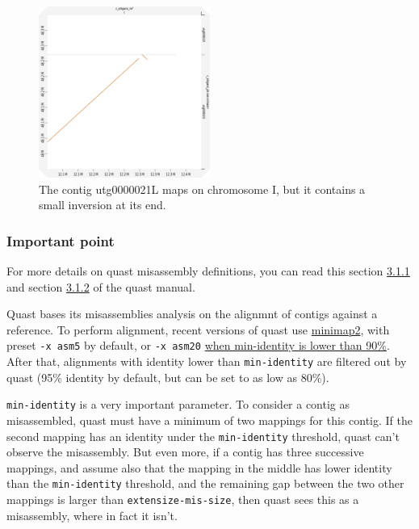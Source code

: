\documentclass[./main.tex]{subfiles}
\begin{document}
\begin{figure}[ht]
    \centering
    \includegraphics[width=0.5\textwidth]{paper/misassemblies-in-noisy-assemblies/inversion_dotplot_exemple.pdf}
    \caption{The contig utg0000021L maps on chromosome I, but it contains a small inversion at its end.}
    \label{inversion_exp}
\end{figure}

\subsubsection{Important point}

For more details on quast misassembly definitions, you can read this
section \href{http://quast.bioinf.spbau.ru/manual.html\#misassemblies}{3.1.1} and section \href{http://quast.bioinf.spbau.ru/manual.html\#sec3.1.2}{3.1.2} of the quast manual.

Quast bases its misassemblies analysis on the alignmnt of contigs
against a reference. To perform alignment, recent versions of quast use
\href{https://github.com/lh3/minimap2}{minimap2}, with preset
\texttt{-x\ asm5} by default, or \texttt{-x\ asm20}
\href{https://github.com/ablab/quast/blob/b040cc9140c7630eea95f94cdda3b825cf4a22c3/quast_libs/ca_utils/align_contigs.py\#L65}{when
min-identity is lower than 90\%}. After that, alignments with identity
lower than \texttt{min-identity} are filtered out by quast (95\%
identity by default, but can be set to as low as 80\%).

\texttt{min-identity} is a very important parameter. To consider a
contig as misassembled, quast must have a minimum of two mappings for
this contig. If the second mapping has an identity under the
\texttt{min-identity} threshold, quast can't observe the misassembly.
But even more, if a contig has three successive mappings, and assume
also that the mapping in the middle has lower identity than the
\texttt{min-identity} threshold, and the remaining gap between the two
other mappings is larger than \texttt{extensize-mis-size}, then quast
sees this as a misassembly, where in fact it isn't.
\end{document}

